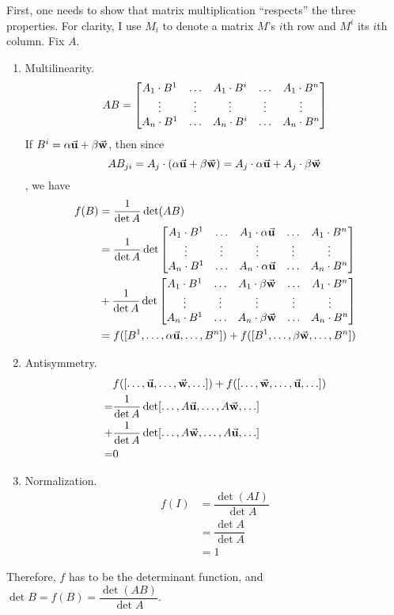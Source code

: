 \documentclass{homework}
\begin{document}
\begin{problem}{4}
First, one needs to show that matrix multiplication ``respects'' the three
properties. For clarity, I use $M_i$ to denote a matrix $M$'s $i$th row and
$M^i$ its $i$th column. Fix $A$.
\begin{enumerate}
\item Multilinearity.
$$AB = \begin{bmatrix}A_1\cdot B^1 & \hdots & A_1\cdot B^i & \hdots & A_1\cdot B^n \\
             \vdots       & \vdots & \vdots       & \vdots & \vdots \\
             A_n\cdot B^1 & \hdots & A_n\cdot B^i & \hdots & A_n\cdot B^n\end{bmatrix}$$
If $B^i = \alpha\vec{\mathbf{u}} + \beta\vec{\mathbf{w}}$, then since
$$AB_{ji} = A_j\cdot(\alpha\vec{\mathbf{u}} + \beta\vec{\mathbf{w}})
= A_j\cdot\alpha\vec{\mathbf{u}} + A_j\cdot\beta\vec{\mathbf{w}}$$
, we have
\begin{align*}
f(B) &= \dfrac{1}{\det A} \det(AB) \\
&= \dfrac{1}{\det A}\det
\begin{bmatrix}A_1\cdot B^1 & \hdots & A_1\cdot\alpha\vec{\mathbf{u}} & \hdots & A_1\cdot B^n \\
      \vdots       & \vdots & \vdots       & \vdots & \vdots \\
      A_n\cdot B^1 & \hdots & A_n\cdot\alpha\vec{\mathbf{u}} & \hdots & A_n\cdot B^n\end{bmatrix}\\
&+ \dfrac{1}{\det A}\det
\begin{bmatrix}A_1\cdot B^1 & \hdots & A_1\cdot\beta\vec{\mathbf{w}} & \hdots & A_1\cdot B^n \\
      \vdots       & \vdots & \vdots       & \vdots & \vdots \\
      A_n\cdot B^1 & \hdots & A_n\cdot\beta\vec{\mathbf{w}} & \hdots & A_n\cdot B^n\end{bmatrix}\\
&= f([B^1,\hdots,\alpha\vec{\mathbf{u}},\hdots,B^n])
 + f([B^1,\hdots,\beta \vec{\mathbf{w}},\hdots,B^n])
\end{align*}

\item Antisymmetry.
\begin{align*}
& f([\hdots,\vec{\mathbf{u}},\hdots,\vec{\mathbf{w}},\hdots]) + 
  f([\hdots,\vec{\mathbf{w}},\hdots,\vec{\mathbf{u}},\hdots])
\\ =&
\dfrac{1}{\det A}\det[\hdots,A\vec{\mathbf{u}},\hdots,A\vec{\mathbf{w}},\hdots] \\ +&
\dfrac{1}{\det A}\det[\hdots,A\vec{\mathbf{w}},\hdots,A\vec{\mathbf{u}},\hdots]
\\ =& 0
\end{align*}

\item Normalization.
\begin{align*}
f(I) &= \dfrac{\det(AI)}{\det A} \\
     &= \dfrac{\det A}{\det A} \\
     &= 1
\end{align*}
\end{enumerate}
Therefore, $f$ has to be the determinant function, and
$\det B = f(B) = \dfrac{\det(AB)}{\det A}$. \QED
\end{problem}
\end{document}
